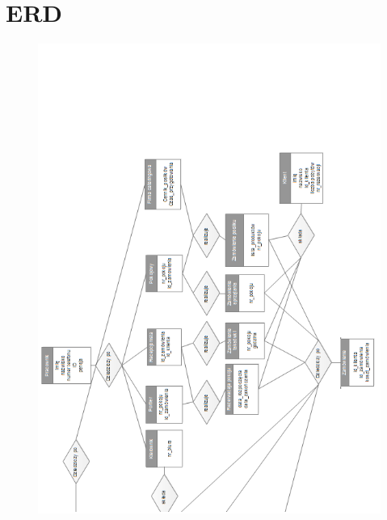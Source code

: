 \documentclass[a4paper, 11pt]{article}
\begin{document}
		
	
	
	\section{ERD}
	\indent
	\begin{figure}[H]%
			\includegraphics[scale=1.0]{Img/ERD1.png}
	\end{figure}
\end{document}
